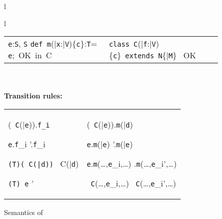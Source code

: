\begin{figure*}
\begin{tabular}{l}
{\begin{tabular}{l}
\begin{tabular}{p{}p{}}
{	  {\tt e}:{\tt S}, {\tt S} \subtype {\tt T}}
	{{\tt def}\ {\tt m}(\bar{\tt x}:\bar{\tt V})\{{\tt c}\}:{\tt T}= {\tt e};\ \mbox{OK in}\ C}
	&
\infrule[Class OK]
	{\bar{\tt M}\ \mbox{OK in}\ {\tt C}\andalso \this:{\tt C}\vdash {\tt c}:o \andalso \this:{\tt C},{\tt c} \vdash \bar{\tt V}\ \type, {\tt N}\ \type}
	{\mbox{\tt class}\ {\tt C}(\bar{\tt f}:\bar{\tt V})\{{\tt c}\}\ 
	  \mbox{\tt extends}\ {\tt N}\{\bar{\tt M}\} \ \mbox{OK}}
\end{tabular}
\end{tabular}}\\
\quad\\
{\bf Transition rules:}\\
{\tabcolsep=0pt
\begin{tabular}{p{0.43\textwidth}@{\quad}p{0.54\textwidth}}
\typicallabel{RC-Field}
\infrule[\RField]
	{\tt x:C \vdash \fields(\tt x)=\bar{\tt f}:\bar{\tt V}}
	{(\new\ {\tt C}(\bar{\tt e})).{\tt f_i} \derives {\tt e_i}}

\infrule[\RCField]%
	{{\tt e} \derives {{\tt e}}'}
	{{\tt e}.{\tt f}_i \derives {{\tt e}}'.{\tt f}_i}

\infrule[\RCast]%
	{\vdash {\tt C}\{\self==\new\ C(\bar{\tt d})\} \subtype {\tt T}}
	{{\tt (T)(\new\ C(\bar{\tt d}))} \derives \new\ C(\bar{\tt d})}

\infrule[\RCCast]%
	{{\tt e} \derives {{\tt e}}'}
	{{\tt (T) e} \derives {{\tt (T) e}}'}
	&
	\typicallabel{R-Invk-Recv}
	\infrule[\RInvk]
		{{\tt x:C}\vdash {\tt x}\ \has\ {\tt m}(\bar{\tt x}:\bar{\tt T}){\tt \{c\}:T=e}}
		{(\new\ {\tt C}(\bar{\tt e})).{\tt m}(\bar{\tt d}) \derives {\tt e[\new\ {\tt C}(\bar{\tt e}),\bar{\tt d}/\this,\bar{\tt x}]}}

	\infrule[\RCInvkRecv]%
		{{\tt e} \derives {{\tt e}}'}
		{{\tt e}.{\tt m}(\bar{\tt e}) \derives {{\tt e}}'.{\tt m}(\bar{\tt e})}

	\infrule[\RCInvkArg]%
		{{\tt e}_i \derives {{\tt e}_i}'}
		{{\tt e}.{\tt m}(\ldots,{\tt e}_i,\ldots) \derives {{\tt e}}.{\tt m}(\ldots,{\tt e}_i',\ldots)} 

	\infrule[\RCNewArg]%
		{{\tt e}_i \derives {{\tt e}_i}'}
		{\new\ {\tt C}(\ldots,{\tt e}_i,\ldots) \derives \new\ {\tt C}(\ldots,{\tt e}_i',\ldots)}
\end{tabular}
}
\end{tabular}  
 \caption{Semantics of \FX}\label{fig:FX}
\end{figure*}
